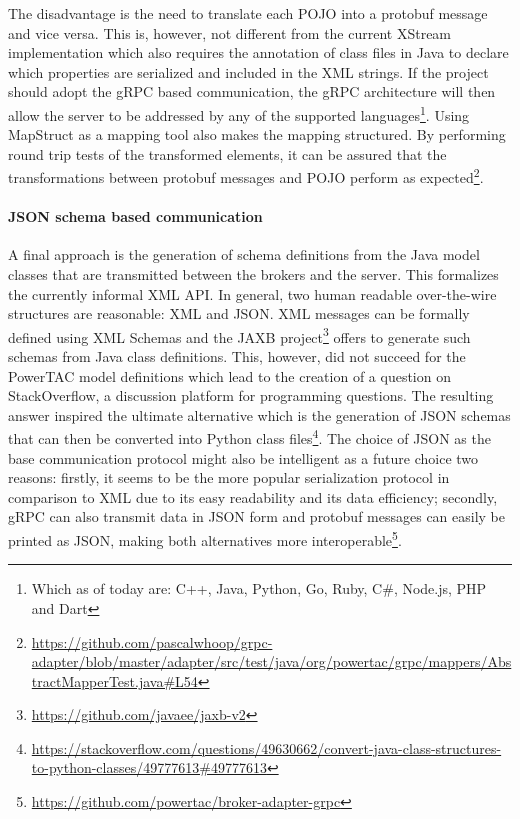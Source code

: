The disadvantage is the need to translate each \ac{POJO} into a protobuf message and
vice versa. This is, however, not different from the current XStream implementation which also requires the annotation of
class files in Java to declare which properties are serialized and included in the \ac{XML} strings. If the project
should adopt the \ac{gRPC} based communication, the \ac{gRPC} architecture will then allow the server to be addressed by any of the supported languages\footnote{Which as of today are: C++, Java, Python, Go, Ruby, C\#, Node.js, PHP and
Dart}. Using MapStruct as a mapping tool also makes the mapping structured. By performing round trip tests of the
transformed elements, it can be assured that the transformations between protobuf messages and \ac{POJO} perform as
expected\footnote{\url{https://github.com/pascalwhoop/grpc-adapter/blob/master/adapter/src/test/java/org/powertac/grpc/mappers/AbstractMapperTest.java\#L54}}.



\paragraph{JSON schema based communication}%
\label{sub:json_schema_based_communication}


A final approach is the generation of schema definitions from the Java model classes that are transmitted between the
brokers and the server. This formalizes the currently informal \ac{XML} \ac{API}. In general, two human readable
over-the-wire structures are reasonable: \ac{XML} and \ac{JSON}.  \ac{XML} messages can be formally defined using
\ac{XML} Schemas and the \ac{JAXB} project\footnote{\url{https://github.com/javaee/jaxb-v2}} offers to generate such
schemas from Java class definitions. This, however, did not succeed for the \ac{PowerTAC} model definitions which lead
to the creation of a question on StackOverflow, a discussion platform for programming questions. The resulting answer
inspired the ultimate alternative which is the generation of \ac{JSON} schemas that can then be converted into Python
class
files\footnote{\url{https://stackoverflow.com/questions/49630662/convert-java-class-structures-to-python-classes/49777613\#49777613}}.
The choice of \ac{JSON} as the base communication protocol might also be intelligent as a future choice two reasons:
firstly, it seems to be the more popular serialization protocol in comparison to \ac{XML} \citep{jsonxml} due to its
easy readability and its data efficiency; secondly, \ac{gRPC} can also transmit data in \ac{JSON} form and
protobuf messages can easily be printed as \ac{JSON}, making both alternatives more
interoperable\footnote{\url{https://github.com/powertac/broker-adapter-grpc} }.

